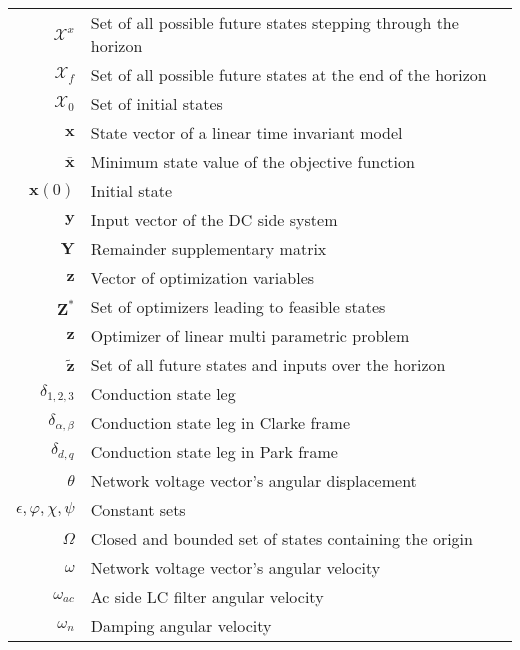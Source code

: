 \begin{scriptsize}
\begin{tabularx}{\textwidth}{r|X}
  $\mathcal{X}^x$             & Set of all possible future states stepping through the horizon\\
  $\mathcal{X}_f$             & Set of all possible future states at the end of the horizon\\
  $\mathcal{X}_0$             & Set of initial states\\
  $\textbf{x}$											& State vector of a linear time invariant model\\
  $\bar{\textbf{x}}$											& Minimum state value of the objective function\\
  $\textbf{x}(0)$                 & Initial state\\
  
  $\textbf{y}$                  & Input vector of the DC side system\\
  $\textbf{Y}$                  & Remainder supplementary matrix\\
  
  $\textbf{z}$                  & Vector of optimization variables\\
  $\textbf{Z}^*$              & Set of optimizers leading to feasible states\\
  $\textbf{z}$											& Optimizer of linear multi parametric problem\\
  $\tilde{\textbf{z}}$        & Set of all future states and inputs over the horizon\\
  
  $\delta_{1,2,3}$                  & Conduction state leg\\
  $\delta_{\alpha,\beta}$           & Conduction state leg in Clarke frame\\
  $\delta_{d,q}$                    & Conduction state leg in Park frame\\
  $\theta$                          & Network voltage vector’s angular displacement\\
  $\epsilon,\varphi,\chi,\psi$               & Constant sets\\
  $\Omega$                          & Closed and bounded set of states containing the origin\\
  $\omega$                          & Network voltage vector’s angular velocity\\
  $\omega_{ac}$                     & Ac side LC filter angular velocity\\
  $\omega_{n}$                      & Damping angular velocity\\
  \end{tabularx}
  \end{scriptsize} 
